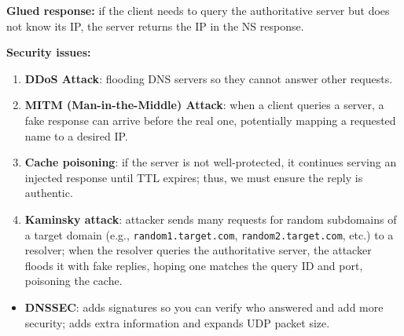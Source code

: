 \textbf{Glued response:} if the client needs to query the authoritative server but does not know its IP, the server returns the IP in the NS response.

\textbf{Security issues:}
\begin{enumerate}
	\item \textbf{DDoS Attack}: flooding DNS servers so they cannot answer other requests.
	\item \textbf{MITM (Man-in-the-Middle) Attack}: when a client queries a server, a fake response can arrive before the real one, potentially mapping a requested name to a desired IP.
	\item \textbf{Cache poisoning}: if the server is not well-protected, it continues serving an injected response until TTL expires; thus, we must ensure the reply is authentic.
	\item \textbf{Kaminsky attack}: attacker sends many requests for random subdomains of a target domain (e.g., \texttt{random1.target.com}, \texttt{random2.target.com}, etc.) to a resolver; when the resolver queries the authoritative server, the attacker floods it with fake replies, hoping one matches the query ID and port, poisoning the cache.
\end{enumerate}
\begin{itemize}
	\item \textbf{DNSSEC}: adds signatures so you can verify who answered and add more security; adds extra information and expands UDP packet size.
\end{itemize}

